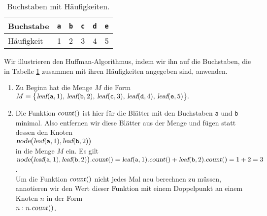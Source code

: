 \begin{table}[htbp]
  \centering
\begin{tabular}[t]{|l|r|r|r|r|r|}
\hline
Buchstabe  & \texttt{a} & \texttt{b} & \texttt{c} & \texttt{d} & \texttt{e} \\
\hline
H\"aufigkeit &          1 &          2 &          3 &          4 &          5 \\
\hline
\end{tabular}
  \caption{Buchstaben mit H\"aufigkeiten.}
  \label{tab:frequency}
\end{table}

Wir illustrieren den  Huffman-Algorithmus, indem wir ihn auf die Buchstaben, die in
Tabelle \ref{tab:frequency} zusammen mit ihren H\"aufigkeiten angegeben sind, anwenden.
\begin{enumerate}
\item Zu Beginn hat die Menge $M$ die Form
      \\[0.2cm]
      \hspace*{0.3cm}
      $ M = \bigl\{ \textsl{leaf}(\mathtt{a},1),\,
             \textsl{leaf}(\mathtt{b},2),\, 
             \textsl{leaf}(\mathtt{c},3),\,
             \textsl{leaf}(\mathtt{d},4),\,
             \textsl{leaf}(\mathtt{e},5)\bigr\}. $
\item Die Funktion $\textsl{count}()$ ist hier f\"ur die Bl\"atter mit den Buchstaben \texttt{a} und
      \texttt{b} minimal.  Also entfernen wir diese Bl\"atter aus der Menge und f\"ugen statt
      dessen den Knoten 
      \\[0.2cm]
      \hspace*{0.3cm}
      $\textsl{node}\bigl(\textsl{leaf}(\mathtt{a},1), \textsl{leaf}(\mathtt{b},2)\bigr)$
      \\[0.2cm]
      in die Menge $M$ ein.  Es gilt
      \\[0.2cm]
      \hspace*{0.3cm}
      $\textsl{node}\bigl(\textsl{leaf}(\mathtt{a},1), \textsl{leaf}(\mathtt{b},2)\bigr).\textsl{count}()
       = \textsl{leaf}(\mathtt{a},1).\textsl{count}()+  \textsl{leaf}(\mathtt{b},2).\textsl{count}()
       = 1 + 2 = 3$.
      \\[0.2cm]
      Um die Funktion $\textsl{count}()$ nicht jedes Mal neu berechnen zu m\"ussen, annotieren wir
      den Wert dieser Funktion mit einem Doppelpunkt an einem Knoten $n$ in der Form 
      \\[0.2cm]
      \hspace*{0.3cm}
      $n:n.\textsl{count}()$.
      \\[0.2cm]

\end{enumerate}
